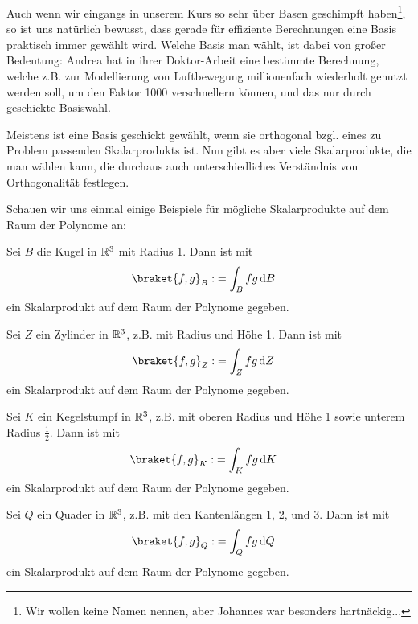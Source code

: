 Auch wenn wir eingangs in unserem Kurs so sehr über Basen geschimpft haben\footnote{Wir wollen keine Namen nennen, aber Johannes war besonders hartnäckig...}, so ist uns natürlich bewusst, dass gerade für effiziente Berechnungen eine Basis praktisch immer gewählt wird. Welche Basis man wählt, ist dabei von großer Bedeutung: Andrea hat in ihrer Doktor-Arbeit eine bestimmte Berechnung, welche z.B. zur Modellierung von Luftbewegung millionenfach wiederholt genutzt werden soll, um den Faktor 1000 verschnellern können, und das nur durch geschickte Basiswahl. 

\begin{remark}
	Meistens ist eine Basis geschickt gewählt, wenn sie orthogonal bzgl. eines zu Problem passenden Skalarprodukts ist. Nun gibt es aber viele Skalarprodukte, die man wählen kann, die durchaus auch unterschiedliches Verständnis von Orthogonalität festlegen.
\end{remark}
Schauen wir uns einmal einige Beispiele für mögliche Skalarprodukte auf dem Raum der Polynome an:
\begin{example}
	Sei $B$ die Kugel in $\mathbb{R}^3$ mit Radius 1. Dann ist mit
	\begin{align*}
		\braket{f,g}_B :&= \int_B f g \dd B
	\end{align*}
	ein Skalarprodukt auf dem Raum der Polynome gegeben.
\end{example}

\begin{example}
	Sei $Z$ ein Zylinder in $\mathbb{R}^3$, z.B. mit Radius und Höhe 1. Dann ist mit
	\begin{align*}
		\braket{f,g}_Z :&= \int_Z f g \dd Z
	\end{align*}
	ein Skalarprodukt auf dem Raum der Polynome gegeben.
\end{example}

\begin{example}
	Sei $K$ ein Kegelstumpf in $\mathbb{R}^3$, z.B. mit oberen Radius und Höhe 1 sowie unterem Radius $\frac{1}{2}$. Dann ist mit
	\begin{align*}
		\braket{f,g}_K :&= \int_K f g \dd K
	\end{align*}
	ein Skalarprodukt auf dem Raum der Polynome gegeben.
\end{example}

\begin{example}
	Sei $Q$ ein Quader in $\mathbb{R}^3$, z.B. mit den Kantenlängen 1, 2, und 3. Dann ist mit 
	\begin{align*}
		\braket{f,g}_Q :&= \int_Q f g \dd Q
	\end{align*}
	ein Skalarprodukt auf dem Raum der Polynome gegeben.
\end{example}

